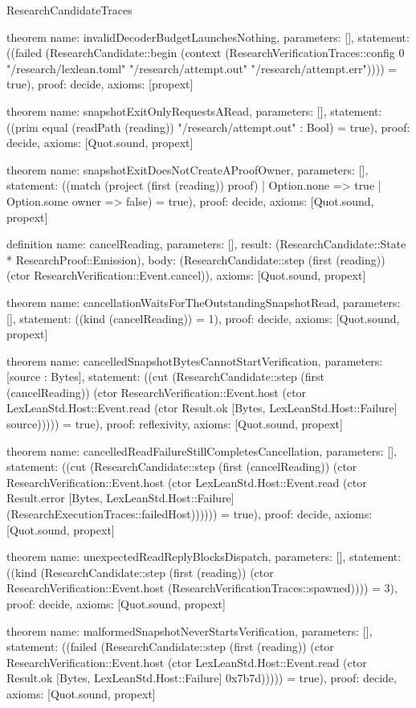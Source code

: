 \begin{lexlean}{ResearchCandidateTraces}
\begin{semanticmodule}
theorem{
 name: invalidDecoderBudgetLaunchesNothing,
 parameters: [],
 statement: ((failed (ResearchCandidate::begin (context (ResearchVerificationTraces::config 0 "/research/lexlean.toml" "/research/attempt.out" "/research/attempt.err")))) = true),
 proof: decide{},
 axioms: [propext]
}

theorem{
 name: snapshotExitOnlyRequestsARead,
 parameters: [],
 statement: ((prim equal (readPath (reading)) "/research/attempt.out" : Bool) = true),
 proof: decide{},
 axioms: [Quot.sound, propext]
}

theorem{
 name: snapshotExitDoesNotCreateAProofOwner,
 parameters: [],
 statement: ((match (project (first (reading)) proof) | Option.none => true | Option.some owner => false) = true),
 proof: decide{},
 axioms: [Quot.sound, propext]
}

definition{
 name: cancelReading,
 parameters: [],
 result: (ResearchCandidate::State * ResearchProof::Emission),
 body: (ResearchCandidate::step (first (reading)) (ctor ResearchVerification::Event.cancel)),
 axioms: [Quot.sound, propext]
}

theorem{
 name: cancellationWaitsForTheOutstandingSnapshotRead,
 parameters: [],
 statement: ((kind (cancelReading)) = 1),
 proof: decide{},
 axioms: [Quot.sound, propext]
}

theorem{
 name: cancelledSnapshotBytesCannotStartVerification,
 parameters: [source : Bytes],
 statement: ((cut (ResearchCandidate::step (first (cancelReading)) (ctor ResearchVerification::Event.host (ctor LexLeanStd.Host::Event.read (ctor Result.ok [Bytes, LexLeanStd.Host::Failure] source))))) = true),
 proof: reflexivity{},
 axioms: [Quot.sound, propext]
}

theorem{
 name: cancelledReadFailureStillCompletesCancellation,
 parameters: [],
 statement: ((cut (ResearchCandidate::step (first (cancelReading)) (ctor ResearchVerification::Event.host (ctor LexLeanStd.Host::Event.read (ctor Result.error [Bytes, LexLeanStd.Host::Failure] (ResearchExecutionTraces::failedHost)))))) = true),
 proof: decide{},
 axioms: [Quot.sound, propext]
}

theorem{
 name: unexpectedReadReplyBlocksDispatch,
 parameters: [],
 statement: ((kind (ResearchCandidate::step (first (reading)) (ctor ResearchVerification::Event.host (ResearchVerificationTraces::spawned)))) = 3),
 proof: decide{},
 axioms: [Quot.sound, propext]
}

theorem{
 name: malformedSnapshotNeverStartsVerification,
 parameters: [],
 statement: ((failed (ResearchCandidate::step (first (reading)) (ctor ResearchVerification::Event.host (ctor LexLeanStd.Host::Event.read (ctor Result.ok [Bytes, LexLeanStd.Host::Failure] 0x7b7d))))) = true),
 proof: decide{},
 axioms: [Quot.sound, propext]
}


\end{semanticmodule}
\end{lexlean}
